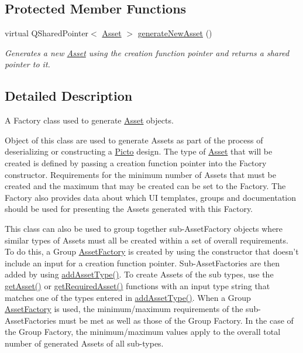 \subsection*{Protected Member Functions}
\begin{DoxyCompactItemize}
\item 
\hypertarget{class_picto_1_1_asset_factory_a14e947ad4b201432c1cf59e1211fc47a}{virtual Q\-Shared\-Pointer$<$ \hyperlink{class_picto_1_1_asset}{Asset} $>$ \hyperlink{class_picto_1_1_asset_factory_a14e947ad4b201432c1cf59e1211fc47a}{generate\-New\-Asset} ()}\label{class_picto_1_1_asset_factory_a14e947ad4b201432c1cf59e1211fc47a}

\begin{DoxyCompactList}\small\item\em Generates a new \hyperlink{class_picto_1_1_asset}{Asset} using the creation function pointer and returns a shared pointer to it. \end{DoxyCompactList}\end{DoxyCompactItemize}


\subsection{Detailed Description}
A Factory class used to generate \hyperlink{class_picto_1_1_asset}{Asset} objects. 

Object of this class are used to generate Assets as part of the process of deserializing or constructing a \hyperlink{namespace_picto}{Picto} design. The type of \hyperlink{class_picto_1_1_asset}{Asset} that will be created is defined by passing a creation function pointer into the Factory constructor. Requirements for the minimum number of Assets that must be created and the maximum that may be created can be set to the Factory. The Factory also provides data about which U\-I templates, groups and documentation should be used for presenting the Assets generated with this Factory.

This class can also be used to group together sub-\/\-Asset\-Factory objects where similar types of Assets must all be created within a set of overall requirements. To do this, a Group \hyperlink{class_picto_1_1_asset_factory}{Asset\-Factory} is created by using the constructor that doesn't include an input for a creation function pointer. Sub-\/\-Asset\-Factories are then added by using \hyperlink{class_picto_1_1_asset_factory_a682f965c48d41064f9f13c9ab75a984e}{add\-Asset\-Type()}. To create Assets of the sub types, use the \hyperlink{class_picto_1_1_asset_factory_a1d13b02e964d37012d2b02e0fa940969}{get\-Asset()} or \hyperlink{class_picto_1_1_asset_factory_a4106be868f80f09f3a64cea4de1f42dd}{get\-Required\-Asset()} functions with an input type string that matches one of the types entered in \hyperlink{class_picto_1_1_asset_factory_a682f965c48d41064f9f13c9ab75a984e}{add\-Asset\-Type()}. When a Group \hyperlink{class_picto_1_1_asset_factory}{Asset\-Factory} is used, the minimum/maximum requirements of the sub-\/\-Asset\-Factories must be met as well as those of the Group Factory. In the case of the Group Factory, the minimum/maximum values apply to the overall total number of generated Assets of all sub-\/types.

